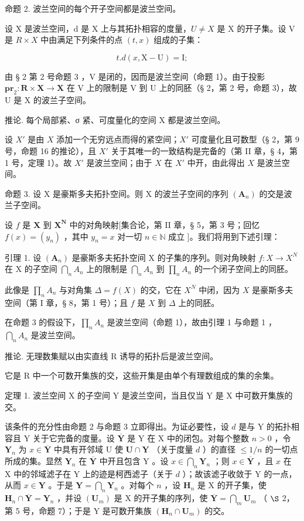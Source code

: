 命题 2. 波兰空间的每个开子空间都是波兰空间。

设 X 是波兰空间，d 是 X 上与其拓扑相容的度量，\(U \neq X\) 是 X 的开子集。设 V 是 \(R \times X\) 中由满足下列条件的点 \((t, x)\) 组成的子集：

\[
t. d (x, \mathrm{X} - \mathrm{U}) = \mathrm{I};
\]

由 § 2 第 2 号命题 3 ，V 是闭的，因而是波兰空间（命题 1）。由于投影 \(\mathbf{pr}_{2}:\mathbf{R}\times\mathbf{X}\to\mathbf{X}\) 在 V 上的限制是 V 到 U 上的同胚（§ 2，第 2 号，命题 3），故 U 是 X 的波兰子空间。

推论. 每个局部紧、σ 紧、可度量化的空间 X 都是波兰空间。

设 \(X'\) 是由 \(X\) 添加一个无穷远点而得的紧空间；\(X'\) 可度量化且可数型（§ 2，第 9 号，命题 16 的推论），且 \(X'\) 关于其唯一的一致结构是完备的（第 II 章，§ 4，第 1 号，定理 1）。故 \(X'\) 是波兰空间；由于 \(X\) 在 \(X'\) 中开，由此得出 \(X\) 是波兰空间。

命题 3. 设 X 是豪斯多夫拓扑空间。则 X 的波兰子空间的序列 \((\mathbf{A}_{n})\) 的交是波兰子空间。

设 \(f\) 是 \(\mathbf{X}\) 到 \(\mathbf{X}^{\mathbf{N}}\) 中的对角映射{[}集合论，第 II 章，§ 5，第 3 号；回忆 \(f(x) = (y_n)\) ，其中 \(y_n = x\) 对一切 \(n \in \mathbb{N}\) 成立 {]}。我们将用到下述引理：

引理 1. 设 \((\mathbf{A}_{n})\) 是豪斯多夫拓扑空间 X 的子集的序列。则对角映射 \(f: X \to X^{N}\) 在 X 的子空间 \(\bigcap_{n} A_{n}\) 上的限制是 \(\bigcap_{n} A_{n}\) 到 \(\prod_{n} A_{n}\) 的一个闭子空间上的同胚。

此像是 \(\prod_{n} A_n\) 与对角集 \(\Delta = f(X)\) 的交，它在 \(X^N\) 中闭，因为 \(X\) 是豪斯多夫空间（第 I 章，§ 8，第 1 号）；且 \(f\) 是 \(X\) 到 \(\Delta\) 上的同胚。

在命题 3 的假设下，\(\prod_{n} A_{n}\) 是波兰空间（命题 1），故由引理 1 与命题 1 ，\(\bigcap_{n} A_{n}\) 是波兰空间。

推论. 无理数集赋以由实直线 R 诱导的拓扑后是波兰空间。

它是 R 中一个可数开集族的交，这些开集是由单个有理数组成的集的余集。

定理 1. 波兰空间 X 的子空间 Y 是波兰空间，当且仅当 Y 是 X 中可数开集族的交。

该条件的充分性由命题 2 与命题 3 立即得出。为证必要性，设 \(d\) 是与 Y 的拓扑相容且 Y 关于它完备的度量。设 \(\overline{\mathbf{Y}}\) 是 Y 在 X 中的闭包。对每个整数 \(n>0\) ，令 \(\mathbf{Y}_{n}\) 为 \(x\in\overline{\mathbf{Y}}\) 中具有开邻域 U 使 \(\mathbf{U}\cap\mathbf{Y}\) （关于度量 \(d\) ）的直径 \(\leqslant1/n\) 的一切点所成的集。显然 \(\mathbf{Y}_{n}\) 在 \(\overline{\mathbf{Y}}\) 中开且包含 Y 。设 \(x\in\bigcap_{n}\mathbf{Y}_{n}\) ；则 \(x\in\overline{\mathbf{Y}}\) ，且 \(x\) 在 X 中的邻域滤子在 Y 上的迹是柯西滤子（关于 \(d\) ）；故该滤子收敛于 Y 的一点，从而 \(x\in\mathbf{Y}\) 。于是 \(\mathbf{Y}=\bigcap_{n}\mathbf{Y}_{n}\) 。对每个 \(n\) ，设 \(\mathbf{H}_{n}\) 是 X 的开子集，使 \(\mathbf{H}_{n}\cap\overline{\mathbf{Y}}=\mathbf{Y}_{n}\) ，并设 \((\mathbf{U}_{m})\) 是 X 的开子集的序列，使 \(\overline{\mathbf{Y}}=\bigcap_{m}\mathbf{U}_{m}\) （ \(\S\) 2，第 5 号，命题 7）；于是 Y 是可数开集族 \((\mathbf{H}_{n}\cap\mathbf{U}_{m})\) 的交。

